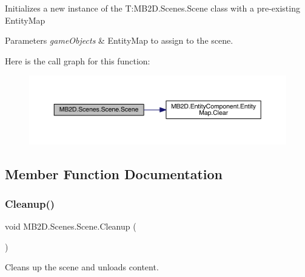 Initializes a new instance of the T\+:\+M\+B2\+D.\+Scenes.\+Scene class with a pre-\/existing Entity\+Map 


\begin{DoxyParams}{Parameters}
{\em game\+Objects} & Entity\+Map to assign to the scene.\\
\hline
\end{DoxyParams}
Here is the call graph for this function\+:\nopagebreak
\begin{figure}[H]
\begin{center}
\leavevmode
\includegraphics[width=350pt]{class_m_b2_d_1_1_scenes_1_1_scene_ac9cb0c45a98614e7e4c1307ebb6ef85e_cgraph}
\end{center}
\end{figure}


\subsection{Member Function Documentation}
\hypertarget{class_m_b2_d_1_1_scenes_1_1_scene_a3ee3777b94ccff0a739e75ca1ca151c6}{}\label{class_m_b2_d_1_1_scenes_1_1_scene_a3ee3777b94ccff0a739e75ca1ca151c6} 
\subsubsection{\texorpdfstring{Cleanup()}{Cleanup()}}
{\footnotesize\ttfamily void M\+B2\+D.\+Scenes.\+Scene.\+Cleanup (\begin{DoxyParamCaption}{ }\end{DoxyParamCaption})\hspace{0.3cm}{\ttfamily [inline]}}



Cleans up the scene and unloads content. 

